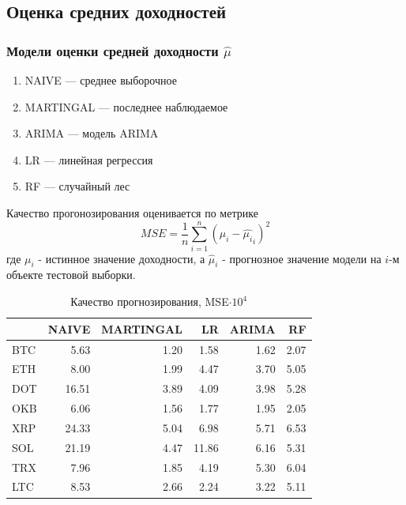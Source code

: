 \documentclass{beamer}
\begin{document}
\subsection{Оценка средних доходностей}

\begin{frame}
    \frametitle{Модели оценки средней доходности $\hat{\mu}$}
    \begin{enumerate}
        \item NAIVE --- среднее выборочное
        \item MARTINGAL --- последнее наблюдаемое
        \item ARIMA --- модель ARIMA
        \item LR --- линейная регрессия
        \item RF --- случайный лес
    \end{enumerate}

    Качество прогонозирования оценивается по метрике 
    \[
	MSE = \frac{1}{n} \sum_{i=1}^{n} (\mu_i - \hat{\mu_i}_i)^2
    \]
    где $\mu_i$ - истинное значение доходности,
    а $\hat{\mu}_i$ - прогнозное значение модели на $i$-м объекте тестовой выборки.
\end{frame}

\begin{frame}
    \begin{table}[h]
    \caption{Качество прогнозирования, MSE$\cdot 10^4$}
        \label{tab:ml_eval_metrics}
        \begin{tabular}{lrrrrr}
            \toprule
            & NAIVE & MARTINGAL & LR & ARIMA & RF \\
            \midrule
            BTC & 5.63 & 1.20 & 1.58 & 1.62 & 2.07 \\
            ETH & 8.00 & 1.99 & 4.47 & 3.70 & 5.05 \\
            DOT & 16.51 & 3.89 & 4.09 & 3.98 & 5.28 \\
            OKB & 6.06 & 1.56 & 1.77 & 1.95 & 2.05 \\
            XRP & 24.33 & 5.04 & 6.98 & 5.71 & 6.53 \\
            SOL & 21.19 & 4.47 & 11.86 & 6.16 & 5.31 \\
            TRX & 7.96 & 1.85 & 4.19 & 5.30 & 6.04 \\
            LTC & 8.53 & 2.66 & 2.24 & 3.22 & 5.11 \\
            \bottomrule
        \end{tabular}
    \end{table}
\end{frame}
\end{document}
